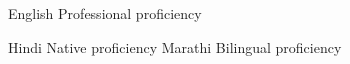 
\begin{cvskills}

  \cvskill
    {English} %
    {Professional proficiency} %

  \cvskill
    {Hindi} %
    {Native proficiency} %
  \cvskill
    {Marathi} %
    {Bilingual proficiency} %

\end{cvskills}
